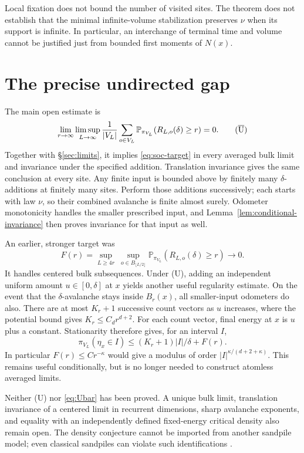 \documentclass[11pt]{article}
\numberwithin{equation}{section}
\theoremstyle{definition}
\newcommand{\Prob}{\mathbb P}
\begin{document}
Local fixation does not bound the number of visited sites. The theorem does not establish that the minimal infinite-volume stabilization preserves $\nu$ when its support is infinite. In particular, an interchange of terminal time and volume cannot be justified just from bounded first moments of $N(x)$.

\section{The precise undirected gap}\label{sec:open}

The main open estimate is
\begin{equation}\label{eq:Ubar}
 \lim_{r\to\infty}\limsup_{L\to\infty}
 \frac1{|V_L|}\sum_{o\in V_L}
 \Prob_{\pi_{V_L}}(R_{L,o}(\delta)\ge r)=0.
 \tag{$\overline{\mathrm U}$}
\end{equation}
Together with \S\ref{sec:limits}, it implies \eqref{eq:soc-target} in every averaged bulk limit and invariance under the specified addition. Translation invariance gives the same conclusion at every site. Any finite input is bounded above by finitely many $\delta$-additions at finitely many sites. Perform those additions successively; each starts with law $\nu$, so their combined avalanche is finite almost surely. Odometer monotonicity handles the smaller prescribed input, and Lemma~\ref{lem:conditional-invariance} then proves invariance for that input as well.

An earlier, stronger target was
\[
 F(r)=\sup_{L\ge4r}\ \sup_{o\in B_{\lfloor L/2\rfloor}}
 \Prob_{\pi_{V_L}}(R_{L,o}(\delta)\ge r)\longrightarrow0.
 \tag{U}
\]
It handles centered bulk subsequences. Under (U), adding an independent uniform amount $u\in[0,\delta]$ at $x$ yields another useful regularity estimate. On the event that the $\delta$-avalanche stays inside $B_r(x)$, all smaller-input odometers do also. There are at most $K_r+1$ successive count vectors as $u$ increases, where the potential bound gives $K_r\le C_dr^{d+2}$. For each count vector, final energy at $x$ is $u$ plus a constant. Stationarity therefore gives, for an interval $I$,
\[
 \pi_{V_L}(\eta_x\in I)\le (K_r+1)|I|/\delta+F(r).
\]
In particular $F(r)\le Cr^{-\kappa}$ would give a modulus of order $|I|^{\kappa/(d+2+\kappa)}$. This remains useful conditionally, but is no longer needed to construct atomless averaged limits.

Neither (U) nor \eqref{eq:Ubar} has been proved. A unique bulk limit, translation invariance of a centered limit in recurrent dimensions, sharp avalanche exponents, and equality with an independently defined fixed-energy critical density also remain open. The density conjecture cannot be imported from another sandpile model; even classical sandpiles can violate such identifications \cite{FLW}.
\end{document}
